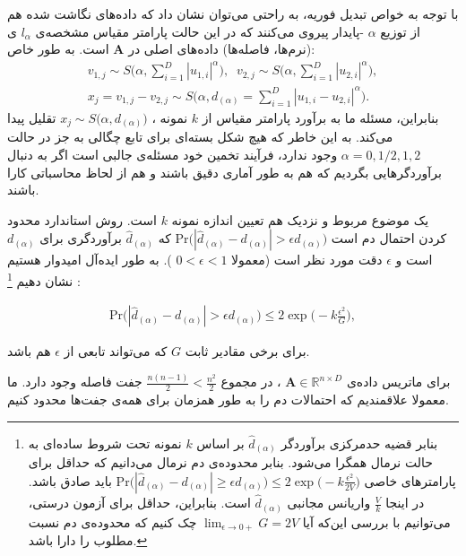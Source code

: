 با توجه به خواص تبدیل فوریه، به راحتی می‌توان نشان داد%
 که داده‌های نگاشت شده هم از توزیع 
$\alpha$%
-پایدار پیروی می‌کنند که در این حالت پارامتر مقیاس مشخصه‌ی 
$l_\alpha$
ی (نرم‌ها، فاصله‌ها) داده‌های اصلی در 
$\mathbf{A}$
است. به طور خاص:
\begin{align}
v_{1,j} \sim S \bigg( \alpha, \sum_{i=1}^D |u_{1,i}|^\alpha \bigg), \;\;
v_{2,j} \sim S \bigg( \alpha, \sum_{i=1}^D |u_{2,i}|^\alpha \bigg),
 \label{eq:1hp}\\
x_j = v_{1,j} - v_{2,j} \sim S \bigg( \alpha, d_{(\alpha)} = 
\sum_{i=1}^D | u_{1,i} - u_{2,i} |^\alpha \bigg).
 \label{eq:1hq}
\end{align}
بنابراین، مسئله ما به برآورد پارامتر مقیاس از 
$k$
نمونه 
، 
$x_j \sim S \big( \alpha, d_{(\alpha)} \big)$
تقلیل پیدا می‌کند. به این خاطر که هیچ شکل بسته‌ای برای تابع چگالی به جز در حالت 
$\alpha = 0, 1/2, 1, 2$
وجود ندارد، فرآیند تخمین خود مسئله‌ی جالبی است اگر به دنبال برآوردگرهایی بگردیم که هم به طور آماری دقیق باشند و هم از لحاظ محاسباتی کارا باشند.

یک موضوع مربوط و نزدیک هم تعیین اندازه نمونه
$k$
است. روش استاندارد محدود کردن احتمال دم است 
$\mathrm{Pr} \big( | \hat{d}_{(\alpha)} - d_{(\alpha)} | > \epsilon d_{(\alpha)} \big)$
که 
$\hat{d}_{(\alpha)}$
برآوردگری برای
$d_{(\alpha)}$
است و 
$\epsilon$
دقت مورد نظر است (معمولا 
$0<\epsilon<1$
). به طور ایده‌آل امیدوار هستیم نشان دهیم
\footnote{
بنابر قضیه حدمرکزی برآوردگر 
$\hat{d}_{(\alpha)}$
بر اساس
$k$
نمونه تحت شروط ساده‌ای به حالت نرمال همگرا می‌شود. بنابر محدوده‌ی دم نرمال می‌دانیم که حداقل برای پارامترهای خاصی 
$\mathrm{Pr} \big( | \hat{d}_{(\alpha)} - d_{(\alpha)} | \geq \epsilon d_{(\alpha)} \big) \leq 2 \exp \Big( -k \frac{\epsilon^2}{2V} \Big)$
باید صادق باشد. در اینجا 
$\frac{V}{k}$
واریانس مجانبی 
$\hat{d}_{(\alpha)}$
است. بنابراین، حداقل برای آزمون درستی، می‌توانیم با بررسی این‌که آیا
$\lim_{\epsilon \rightarrow 0+} G = 2V$
چک کنیم که محدوده‌ی دم نسبت مطلوب را دارا باشد.
}
:

\begin{align}
\mathrm{Pr} \big( | \hat{d}_{(\alpha)} - d_{(\alpha)}| > \epsilon d_{(\alpha)} \big) \leq 2 \exp \bigg( -k \frac{\epsilon^2}{G} \bigg),
\label{eq:1hr}
\end{align}

برای برخی مقادیر ثابت 
$G$
که می‌تواند تابعی از 
$\epsilon$
هم باشد.

برای ماتریس داده‌ی
$\mathbf{A} \in \mathbb{R}^{n \times D}$
، در مجموع 
$\frac{n(n-1)}{2} < \frac{n^2}{2}$
جفت فاصله وجود دارد. ما معمولا علاقمندیم که احتمالات دم را به طور همزمان برای همه‌ی جفت‌ها محدود کنیم. 


